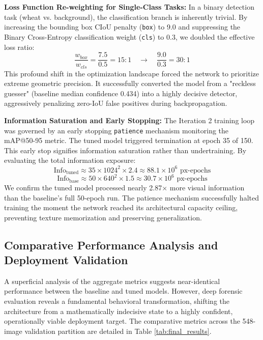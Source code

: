 \textbf{Loss Function Re-weighting for Single-Class Tasks:} 
In a binary detection task (wheat vs. background), the classification branch is inherently trivial. By increasing the bounding box CIoU penalty (\texttt{box}) to 9.0 and suppressing the Binary Cross-Entropy classification weight (\texttt{cls}) to 0.3, we doubled the effective loss ratio:
\begin{equation}
\frac{w_{box}}{w_{cls}} = \frac{7.5}{0.5} = 15:1 \quad \longrightarrow \quad \frac{9.0}{0.3} = 30:1
\end{equation}
This profound shift in the optimization landscape forced the network to prioritize extreme geometric precision. It successfully converted the model from a "reckless guesser" (baseline median confidence 0.434) into a highly decisive detector, aggressively penalizing zero-IoU false positives during backpropagation.

\textbf{Information Saturation and Early Stopping:} 
The Iteration 2 training loop was governed by an early stopping \texttt{patience} mechanism monitoring the mAP@50-95 metric. The tuned model triggered termination at epoch 35 of 150. This early stop signifies information saturation rather than undertraining. By evaluating the total information exposure:
\begin{equation}
\text{Info}_{\text{tuned}} \approx 35 \times 1024^2 \times 2.4 \approx 88.1 \times 10^6 \text{ px-epochs}
\end{equation}
\begin{equation}
\text{Info}_{\text{base}} \approx 50 \times 640^2 \times 1.5 \approx 30.7 \times 10^6 \text{ px-epochs}
\end{equation}
We confirm the tuned model processed nearly 2.87$\times$ more visual information than the baseline's full 50-epoch run. The patience mechanism successfully halted training the moment the network reached its architectural capacity ceiling, preventing texture memorization and preserving generalization. 

\subsection{Comparative Performance Analysis and Deployment Validation}
\label{subsec:final_results}

A superficial analysis of the aggregate metrics suggests near-identical performance between the baseline and tuned models. However, deep forensic evaluation reveals a fundamental behavioral transformation, shifting the architecture from a mathematically indecisive state to a highly confident, operationally viable deployment target. The comparative metrics across the 548-image validation partition are detailed in Table \ref{tab:final_results}.

